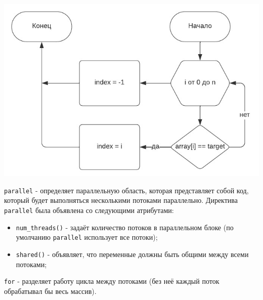 \begin{center}
    \includegraphics[scale=1.4]{images/block_diagram.jpeg}
\end{center}

\newpage


\verb|parallel| - определяет параллельную область, которая представляет собой код, который будет выполняться несколькими потоками параллельно. Директива \verb|parallel| была объявлена со следующими атрибутами:

\vspace{1mm}
\begin{itemize}
\setlength{\itemsep}{10pt}
    \item \verb|num_threads()| - задаёт количество потоков в параллельном блоке (по умолчанию \verb|parallel| использует все потоки);
    \item \verb|shared()| - объявляет, что переменные должны быть общими между всеми потоками;
\end{itemize}
\vspace{3mm}

\verb|for| - разделяет работу цикла между потоками (без неё каждый поток обрабатывал бы весь массив).\\


